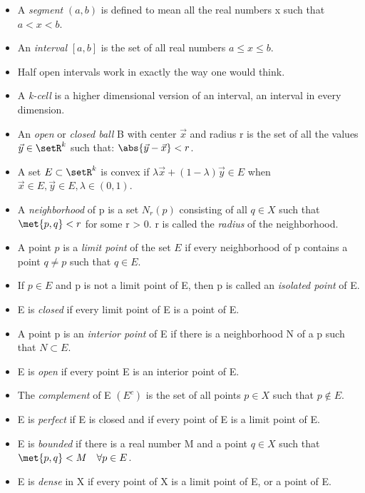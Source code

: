 \documentclass[12pt, letterpaper]{paper}
\begin{document}
\begin{itemize}
\item A \emph{segment} $(a,b)$ is defined to mean all the real numbers
  x such that $a < x < b$.

\item An \emph{interval} $[a,b]$ is the set of all real numbers
  $a \leq x \leq b$.

\item Half open intervals work in exactly the way one would think.

\item A \emph{k-cell} is a higher dimensional version of an interval,
  an interval in every dimension.

\item An \emph{open} or \emph{closed ball} B with center $\vec{x}$ and
  radius r is the set of all the values $\vec{y} \in \setR^{k}$ such
  that: $\abs{ \vec{y} - \vec{x}} < r$.


\item A set $E \subset \setR^{k}$ is convex if
  $\lambda \vec{x} + ( 1 - \lambda ) \vec{y} \in E$ when
  $\vec{x} \in E, \vec{y} \in E, \lambda \in (0,1)$.


\item A \emph{neighborhood} of p is a set $N_{r} (p)$ consisting of
  all $q \in X$ such that $\met{p,q} < r$ for some r > 0. r is called
  the \emph{radius} of the neighborhood.


\item A point $p$ is a \emph{limit point} of the set $E$ if every
  neighborhood of p contains a point $q \neq p$ such that $q \in E$.


\item If $p \in E$ and p is not a limit point of E, then p is called
  an \emph{isolated point} of E.

\item E is \emph{closed} if every limit point of E is a point of E.

\item A point p is an \emph{interior point} of E if there is a
  neighborhood N of a p such that $N \subset E$.

\item E is \emph{open} if every point E is an interior point of E.

\item The \emph{complement} of E $(E^{c})$ is the set of all points
  $p \in X$ such that $p \notin E$.

\item E is \emph{perfect} if E is closed and if every point of E is a
  limit point of E.

\item E is \emph{bounded} if there is a real number M and a point
  $q \in X$ such that $\met{p,q} < M \quad \forall p \in E$.

\item E is \emph{dense} in X if every point of X is a limit point of
  E, or a point of E.
\end{itemize}
\end{document}

